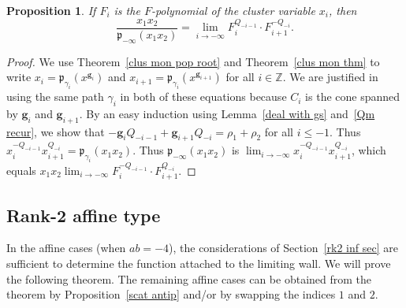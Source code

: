\documentclass[10pt,a4paper]{amsart}
\newtheorem{prop}[theorem]{Proposition}
\theoremstyle{definition}
\newcommand{\integers}{\mathbb Z}
\newcommand{\p}{{\mathfrak p}}
\newcommand{\g}{\mathbf{g}}
\begin{document}
\begin{prop}\label{p inf lim}
If $F_i$ is the $F$-polynomial of the cluster variable $x_i$, then
\begin{equation}\label{p inf lim eq}
\frac{x_1x_2}{\p_{-\infty}(x_1x_2)}=\lim_{i\to-\infty}F_i^{Q_{-i-1}}\cdot F_{i+1}^{-Q_{-i}}.
\end{equation}
\end{prop}
\begin{proof}
We use Theorem~\ref{clus mon pop root} and Theorem~\ref{clus mon thm} to write $x_i=\p_{\gamma_i}(x^{\g_i})$ and $x_{i+1}=\p_{\gamma_i}(x^{\g_{i+1}})$ for all $i\in\integers$.
We are justified in using the same path $\gamma_i$ in both of these equations because $C_i$ is the cone spanned by $\g_i$ and $\g_{i+1}$.
By an easy induction using Lemma~\ref{deal with gs} and~\eqref{Qm recur}, we show that $-\g_iQ_{-i-1}+\g_{i+1}Q_{-i}=\rho_1+\rho_2$ for all $i\le-1$.
Thus $x_i^{-Q_{-i-1}}x_{i+1}^{Q_{-i}}=\p_{\gamma_i}(x_1x_2)$.
Thus $\p_{-\infty}(x_1x_2)$ is $\lim_{i\to-\infty}x_i^{-Q_{-i-1}}x_{i+1}^{Q_{-i}}$, which equals $x_1x_2\lim_{i\to-\infty}F_i^{-Q_{-i-1}}\cdot F_{i+1}^{Q_{-i}}$.
\end{proof}

\subsection{Rank-2 affine type}\label{affrk2 sec}
In the affine cases (when $ab=-4$), the considerations of Section~\ref{rk2 inf sec} are sufficient to determine the function attached to the limiting wall.
We will prove the following theorem.
The remaining affine cases can be obtained from the theorem by Proposition~\ref{scat antip} and/or by swapping the indices $1$ and $2$.
\end{document}
